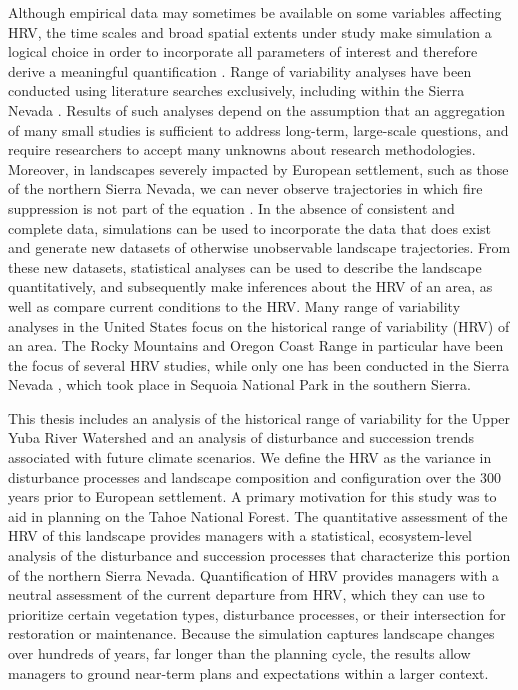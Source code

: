 Although empirical data may sometimes be available on some variables affecting HRV, the time scales and broad spatial extents under study make simulation a logical choice in order to incorporate all parameters of interest and therefore derive a meaningful quantification  \citep{Swetnam1999,Mladenoff1999}. Range of variability analyses have been conducted using literature searches exclusively, including within the Sierra Nevada \citep{Safford2013}. Results of such analyses depend on the assumption that an aggregation of many small studies is sufficient to address long-term, large-scale questions, and require researchers to accept many unknowns about research methodologies. Moreover, in landscapes severely impacted by European settlement, such as those of the northern Sierra Nevada, we can never observe trajectories in which fire suppression is not part of the equation \citep{Keane2012}. In the absence of consistent and complete data, simulations can be used to incorporate the data that does exist and generate new datasets of otherwise unobservable landscape trajectories. From these new datasets, statistical analyses can be used to describe the landscape quantitatively, and subsequently make inferences about the HRV of an area, as well as compare current conditions to the HRV. Many range of variability analyses in the United States focus on the historical range of variability (HRV) of an area. The Rocky Mountains and Oregon Coast Range in particular have been the focus of several HRV studies, while only one has been conducted in the Sierra Nevada \citep{Miller1999}, which took place in Sequoia National Park in the southern Sierra. 

This thesis includes an analysis of the historical range of variability for the Upper Yuba River Watershed and an analysis of disturbance and succession trends associated with future climate scenarios. We define the HRV as the variance in disturbance processes and landscape composition and configuration over the 300 years prior to European settlement. A primary motivation for this study was to aid in planning on the Tahoe National Forest. The quantitative assessment of the HRV of this landscape provides managers with a statistical, ecosystem-level analysis of the disturbance and succession processes that characterize this portion of the northern Sierra Nevada. Quantification of HRV provides managers with a neutral assessment of the current departure from HRV, which they can use to prioritize certain vegetation types, disturbance processes, or their intersection for restoration or maintenance. Because the simulation captures landscape changes over hundreds of years, far longer than the planning cycle, the results allow managers to ground near-term plans and expectations within a larger context. 

